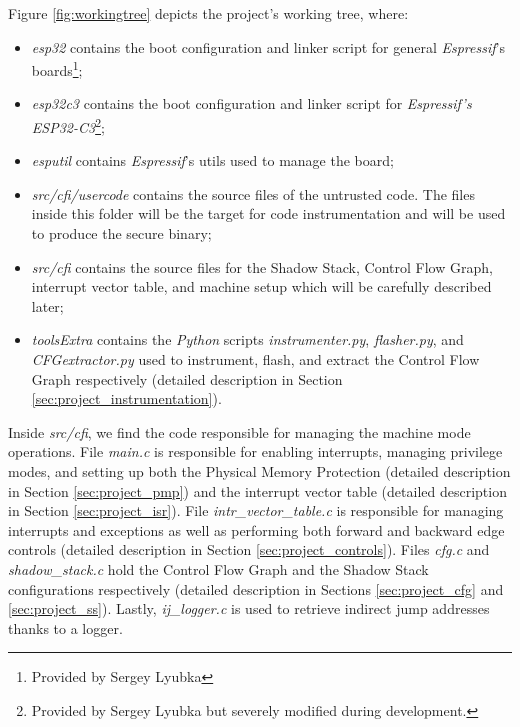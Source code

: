 Figure \ref{fig:workingtree} depicts the project's working tree, where:

\begin{itemize}
  \item \textit{esp32} contains the boot configuration and linker script for
    general \textit{Espressif}'s boards\footnote{Provided by Sergey Lyubka};

  \item \textit{esp32c3} contains the boot configuration and linker script for
    \textit{Espressif's ESP32-C3}\footnote{Provided by Sergey Lyubka but
    severely modified during development.};

  \item \textit{esputil} contains \textit{Espressif}'s utils used to manage the board;

  \item \textit{src/cfi/usercode} contains the source files of the untrusted
    code. The files inside this folder will be the target for code instrumentation
    and will be used to produce the secure binary;

  \item \textit{src/cfi} contains the source files for the Shadow Stack, Control
    Flow Graph, interrupt vector table, and machine setup which will be carefully
    described later;

  \item \textit{toolsExtra} contains the \textit{Python} scripts \textit{instrumenter.py},
    \textit{flasher.py}, and \textit{CFGextractor.py} used to instrument, flash,
    and extract the Control Flow Graph respectively (detailed description in Section
    \ref{sec:project_instrumentation}).
\end{itemize}

Inside \textit{src/cfi}, we find the code responsible for managing the machine
mode operations. File \textit{main.c} is responsible for enabling interrupts, managing
privilege modes, and setting up both the Physical Memory Protection (detailed description
in Section \ref{sec:project_pmp}) and the interrupt vector table (detailed description
in Section \ref{sec:project_isr}). File \textit{intr\_vector\_table.c} is
responsible for managing interrupts and exceptions as well as performing both
forward and backward edge controls (detailed description in Section \ref{sec:project_controls}).
Files \textit{cfg.c} and \textit{shadow\_stack.c} hold the Control Flow Graph and
the Shadow Stack configurations respectively (detailed description in Sections
\ref{sec:project_cfg} and \ref{sec:project_ss}). Lastly, \textit{ij\_logger.c}
is used to retrieve indirect jump addresses thanks to a logger.


